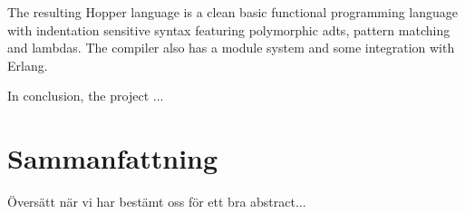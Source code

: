 The resulting Hopper language is a clean basic functional programming language with indentation sensitive syntax featuring polymorphic \glspl{adt}, pattern matching and lambdas. The compiler also has a module system and some integration with Erlang. 

In conclusion, the project ...








\section*{Sammanfattning}
Översätt när vi har bestämt oss för ett bra abstract...



\newpage				%
\thispagestyle{empty}
\mbox{}